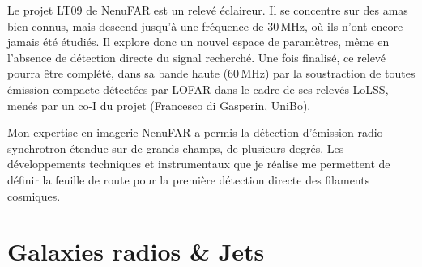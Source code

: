\pg
Le projet LT09 de NenuFAR est un relev\'e \'eclaireur. Il se concentre sur des amas bien connus, mais descend jusqu'\`a une fr\'equence de 30\,MHz, o\`u ils n'ont encore jamais \'et\'e \'etudi\'es. Il explore donc un nouvel espace de param\`etres, m\^eme en l'absence de d\'etection directe du signal recherch\'e. Une fois finalis\'e, ce relev\'e pourra \^etre compl\'et\'e, dans sa bande haute (60\,MHz) par la soustraction de toutes \'emission compacte d\'etect\'ees par LOFAR dans le cadre de ses relev\'es LoLSS, men\'es par un co-I du projet (Francesco di Gasperin, UniBo).%

\begin{tcolorbox}[colback=green!10, colframe=green!50!black, arc=3mm, boxrule=1pt]
	Mon expertise en imagerie NenuFAR a permis la d\'etection d'\'emission radio-synchrotron \'etendue sur de grands champs, de plusieurs degr\'es. Les développements techniques et instrumentaux que je réalise me permettent de définir la feuille de route pour la première détection directe des filaments cosmiques.
\end{tcolorbox}





\section{Galaxies radios \& Jets}

